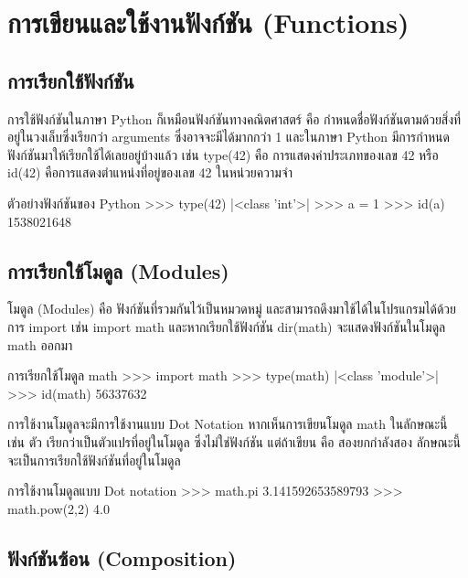 \chapter{การเขียนและใช้งานฟังก์ชัน (Functions)}
\section{การเรียกใช้ฟังก์ชัน}

การใช้ฟังก์ชันในภาษา Python ก็เหมือนฟังก์ชันทางคณิตศาสตร์ คือ กำหนดชื่อฟังก์ชันตามด้วยสิ่งที่อยู่ในวงเล็บซึ่งเรียกว่า arguments ซึ่งอาจจะมีได้มากกว่า 1 และในภาษา Python มีการกำหนดฟังก์ชันมาให้เรียกใช้ได้เลยอยู่บ้างแล้ว เช่น type(42) คือ การแสดงค่าประเภทของเลข 42 หรือ id(42) คือการแสดงตำแหน่งที่อยู่ของเลข 42 ในหน่วยความจำ

\begin{codelist}{ตัวอย่างฟังก์ชันของ Python}{}
>>> type(42)
|<class \rq{}int\rq{}>|
>>> a = 1
>>> id(a)
1538021648
\end{codelist}


\section{การเรียกใช้โมดูล (Modules)}

โมดูล (Modules) คือ ฟังก์ชันที่รวมกันไว้เป็นหมวดหมู่ และสามารถดึงมาใช้ได้ในโปรแกรมได้ด้วยการ import เช่น import math และหากเรียกใช้ฟังก์ชัน dir(math) จะแสดงฟังก์ชันในโมดูล math ออกมา 

\begin{codelist}{การเรียกใช้โมดูล math}{}
>>> import math
>>> type(math)
|<class \rq{}module\rq{}>|
>>> id(math)
56337632

\end{codelist}


การใช้งานโมดูลจะมีการใช้งานแบบ Dot Notation หากเห็นการเขียนโมดูล math ในลักษณะนี้ เช่น   ตัว   เรียกว่าเป็นตัวแปรที่อยู่ในโมดูล   ซึ่งไม่ใช่ฟังก์ชัน แต่ถ้าเขียน   คือ สองยกกำลังสอง ลักษณะนี้จะเป็นการเรียกใช้ฟังก์ชันที่อยู่ในโมดูล

\begin{codelist}{การใช้งานโมดูลแบบ Dot notation}{}
>>> math.pi
3.141592653589793
>>> math.pow(2,2)
4.0
\end{codelist}


\section{ฟังก์ชันซ้อน (Composition)}

